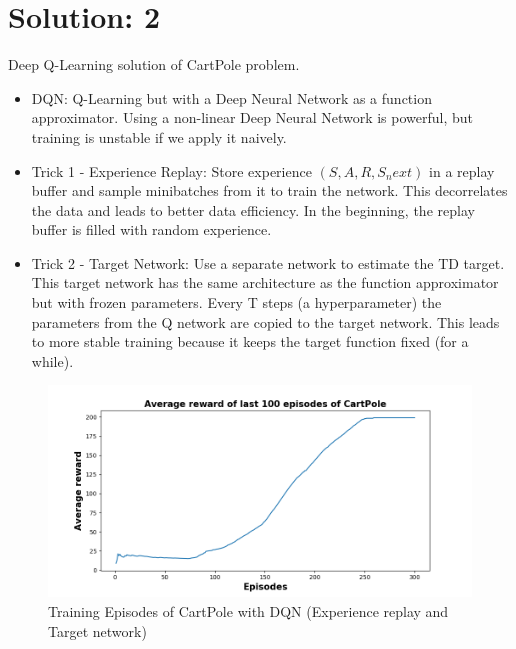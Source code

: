\documentclass[a4paper]{article}
\begin{document}
\newpage
\section*{Solution: 2}
Deep Q-Learning solution of CartPole problem.
\begin{itemize}
\item DQN: Q-Learning but with a Deep Neural Network as a function approximator.
Using a non-linear Deep Neural Network is powerful, but training is unstable if we apply it naively.
\item Trick 1 - Experience Replay: Store experience $(S, A, R, S_next)$ in a replay buffer and sample minibatches from it to train the network. This decorrelates the data and leads to better data efficiency. In the beginning, the replay buffer is filled with random experience.
\item Trick 2 - Target Network: Use a separate network to estimate the TD target. This target network has the same architecture as the function approximator but with frozen parameters. Every T steps (a hyperparameter) the parameters from the Q network are copied to the target network. This leads to more stable training because it keeps the target function fixed (for a while).
\end{itemize}
\begin{figure}[htbp!]
\includegraphics[scale=0.6]{average_reward.png}
\caption{Training Episodes of CartPole with DQN (Experience replay and Target network) }
\end{figure}
\end{document}
